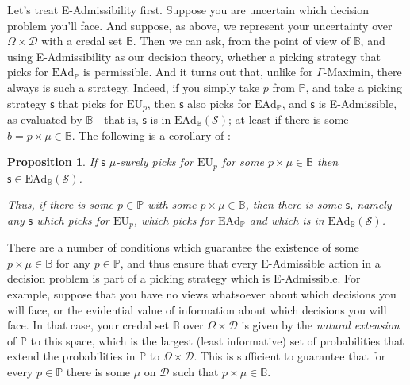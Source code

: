 \documentclass[a4paper]{article}
\newtheorem{proposition}[theorem]{Proposition}
\newcommand\D{\mathcal{D}}
\newcommand\s{\mathsf{s}}
\renewcommand\P{\mathbb{P}} %
\newcommand\EU{\mathrm{EU}}
\newcommand\EAd{\mathrm{EAd}}
\newcommand{\IB}{\mathbb{B}}
\newcommand{\IP}{\P}
\newcommand{\pb}{b}
\renewcommand{\color}[1]{}
\newcommand{\Strategies}{\mathcal{S}}
\newenvironment{CCM rewritten}
{\begingroup\color{blue}} %
{\endgroup}              %
\begin{document}
Let's treat E-Admissibility first. Suppose you are uncertain which decision problem you'll face. And suppose, as above, we represent your uncertainty over $\Omega \times \D$ with a credal set $\IB$. 
 Then we can ask, from the point of view of $\IB$, and using E-Admissibility as our decision theory, whether a picking strategy that picks for $\EAd_\IP$ is permissible. And it turns out that, unlike for $\Gamma$-Maximin, there always is such a strategy. Indeed, if you simply take $p$ from $\IP$, and take a picking strategy $\s$ that picks for $\EU_p$, then $\s$ also picks for $\EAd_\IP$, and $\s$ is E-Admissible, as evaluated by $\IB$---that is, $\s$ is in $\EAd_\IB(\Strategies)$; at least if there is some $\pb=p\times\mu\in\IB$. The following is a corollary of :
 \begin{proposition}\label{thm:ead-suff-indep}
 		If $\s$ $\mu$-surely picks for $\EU_p$ for some $p\times \mu\in \IB$ then $\s\in\EAd_\IB(\Strategies)$. 
 	
 	Thus, if there is some $p\in\IP$ with some $p\times\mu\in \IB$, then there is some $\s$, namely any $\s$ which picks for $\EU_p$, which picks for $\EAd_\IP$ and which is in $\EAd_\IB(\Strategies)$. 
 \end{proposition}
 
 There are a number of conditions which guarantee the existence of some $p\times\mu\in\IB$ for any $p\in\IP${\color{violet}, and thus ensure that every E-Admissible action in a decision problem is part of a picking strategy which is E-Admissible}. 
 For example, suppose that you have no views whatsoever about which decisions you will face{\color{red},  or the evidential value of information about which decisions you will face}. 
 In that case, your credal set $\IB$ over $\Omega\times\D$ is given by the \textit{natural extension} of $\IP$ to this space, which is the largest (least informative) set of probabilities that extend the probabilities in $\IP$ to $\Omega \times \D$. 
 This is sufficient to guarantee that for every $p\in\IP$ there is some $\mu$ on $\D$ such that $p\times\mu\in \IB$.
 
\end{document}
